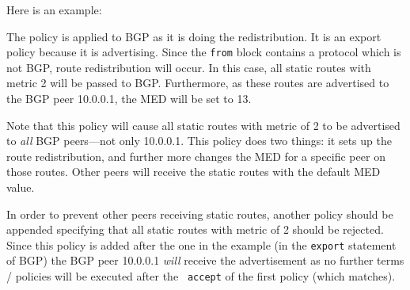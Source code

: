 Here is an example:

\noindent{}

The policy is applied to BGP as it is doing the redistribution.  It is an export
policy because it is advertising.  Since the {\tt from} block contains a
protocol which is not BGP, route redistribution will occur.  In this case, all
static routes with metric 2 will be passed to BGP.  Furthermore, as these routes
are advertised to the BGP peer 10.0.0.1, the MED will be set to 13.

Note that this policy will cause all static routes with metric of 2 to be
advertised to {\em all} BGP peers---not only 10.0.0.1.  This policy does two
things: it sets up the route redistribution, and further more changes the MED 
for a specific peer on those routes.  Other peers will receive the static routes
with the default MED value.  

In order to prevent other peers receiving static routes, another policy should
be appended specifying that all static routes with metric of 2 should be
rejected.  Since this policy is added after the one in the example (in the
{\tt export} statement of BGP) the BGP peer 10.0.0.1 {\em will} receive the
advertisement as no further terms / policies will be executed after the {\tt
accept} of the first policy (which matches).

